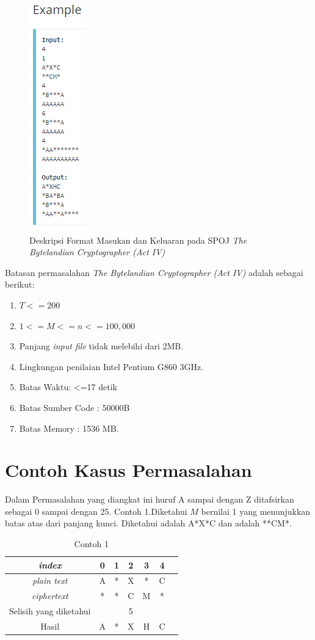 	\begin{figure}[H]
		\centering
		\includegraphics[scale=0.7]{images/bab2/crypto_io2.png}
		\caption{Deskripsi Format Masukan dan Keluaran pada SPOJ \textit{The Bytelandian Cryptographer (Act IV)}}
		\label{fig:crypto4_io}
	\end{figure}
	
	
	Batasan permasalahan \textit{The Bytelandian Cryptographer (Act IV)} adalah sebagai berikut:
	\begin{enumerate}
		\item $T<=200$
		\item $1<=M<=n<=100,000$
		\item Panjang \textit{input file} tidak melebihi dari 2MB.
		\item Lingkungan penilaian Intel Pentium G860 3GHz.
		\item Batas Waktu: <=17 detik
		\item Batas Sumber Code : 50000B
		\item Batas Memory : 1536 MB.                 
	\end{enumerate}

	\section{Contoh Kasus Permasalahan}
	Dalam Permasalahan yang diangkat ini huruf A sampai dengan Z ditafsirkan sebagai 0 sampai dengan 25.
	Contoh 1.Diketahui $M$ bernilai 1 yang menunjukkan batas atas dari panjang kunci. Diketahui \plaintext adalah A*X*C dan \ciphertext adalah **CM*. 
	\begin{table}[H]
	 	\centering
	 	\begin{tabular}{|c|c|c|c|c|c|c|}\hline
	 	\textit{index}&0&1&2&3&4\\ \hline
	 	\textit{plain text}&A&*&X&*&C\\ \hline
	 	\textit{ciphertext}&*&*&C&M&*\\ \hline
	 	Selisih yang diketahui& & &5& & \\ \hline
	 	Hasil              &A&*&X&H&C\\ \hline
	 	\end{tabular}
	 	\caption{Contoh 1}
	 	\label{tab:contoh1}
	\end{table}
	 
